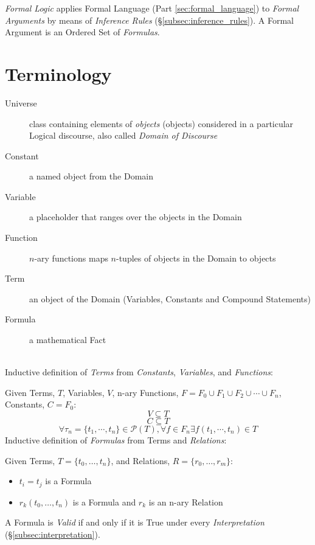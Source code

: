\documentclass{article}
\begin{document}
\emph{Formal Logic} applies Formal Language (Part
\ref{sec:formal_language}) to \emph{Formal Arguments} by means of
\emph{Inference Rules} (\S\ref{subsec:inference_rules}). A Formal
Argument is an Ordered Set of \emph{Formulas}.

\section{Terminology}\label{sec:logic_terminology}

\begin{description}
\item[Universe] class containing elements of \emph{objects} (objects)
  considered in a particular Logical discourse, also called
  \emph{Domain of Discourse}
\item[Constant] a named object from the Domain
\item[Variable] a placeholder that ranges over the objects in the
  Domain
\item[Function] $n$-ary functions maps $n$-tuples of objects in the
  Domain to objects
\item[Term] an object of the Domain (Variables, Constants and Compound
  Statements)
\item[Formula] a mathematical Fact
\end{description}
\hfill \\ Inductive definition of \emph{Terms} from \emph{Constants},
\emph{Variables}, and \emph{Functions}:

Given Terms, $T$, Variables, $V$, n-ary Functions, $F = F_0 \cup F_1
\cup F_2 \cup \cdots \cup F_n$, Constants, $C = F_0$:
\[
    V \subseteq T
\]\[
    C \subseteq T
\]\[
    \forall \tau_n=\{t_1,\cdots,t_n\} \in \mathcal{P}(T), \forall f \in F_n
    \exists f(t_1,\cdots,t_n) \in T
\]
Inductive definition of \emph{Formulas} from Terms and
\emph{Relations}:

Given Terms, $T = \{t_0,\ldots,t_n\}$, and Relations, $R = \{r_0,\ldots,r_m\}$:
\begin{itemize}
\item $t_i = t_j$ is a Formula
\item $r_k(t_0,\ldots,t_n)$ is a Formula and $r_k$ is an n-ary Relation
\end{itemize}
A Formula is \emph{Valid} if and only if it is True under every
\emph{Interpretation} (\S\ref{subsec:interpretation}).
\end{document}
